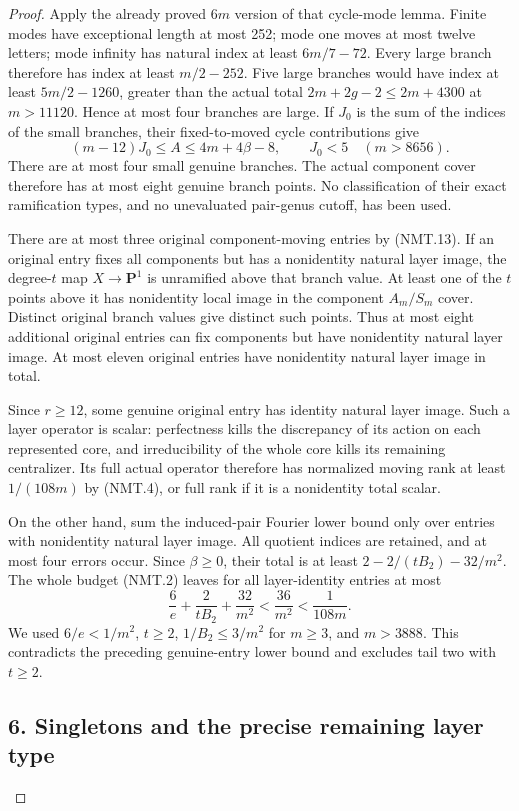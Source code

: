 \begin{proof}
Apply the already proved $6m$ version of that cycle-mode
lemma.  Finite modes have exceptional length at most 252;
mode one moves at most twelve letters; mode infinity has
natural index at least $6m/7-72$.
Every large branch therefore has index at least $m/2-252$.
Five large branches would have index at least $5m/2-1260$,
greater than the actual total $2m+2g-2\le2m+4300$ at
$m>11120$.  Hence at most four branches are large.
If $J_0$ is the sum of the indices of the small branches,
their fixed-to-moved cycle contributions give
\[
 (m-12)J_0\le A\le4m+4\beta-8,\qquad J_0<5
                          \quad(m>8656).
 \tag{NMT.24}
\]
There are at most four small genuine branches.  The actual
component cover therefore has at most eight genuine branch
points.  No classification of their exact ramification types,
and no unevaluated pair-genus cutoff, has been used.

There are at most three original component-moving entries
by (NMT.13).  If an original entry fixes all components but
has a nonidentity natural layer image, the degree-$t$ map
$X\to\mathbf P^1$ is unramified above that branch value.
At least one of the $t$ points above it has nonidentity
local image in the component $A_m/S_m$ cover.
Distinct original branch values give distinct such points.
Thus at most eight additional original entries can fix
components but have nonidentity natural layer image.
At most eleven original entries have nonidentity natural
layer image in total.

Since $r\ge12$, some genuine original entry has identity
natural layer image.  Such a layer operator is scalar:
perfectness kills the discrepancy of its action on each
represented core, and irreducibility of the whole core
kills its remaining centralizer.  Its full actual operator
therefore has normalized moving rank at least $1/(108m)$
by (NMT.4), or full rank if it is a nonidentity total scalar.

On the other hand, sum the induced-pair Fourier lower
bound only over entries with nonidentity natural layer
image.  All quotient indices are retained, and at most
four errors occur.  Since $\beta\ge0$, their total is at
least $2-2/(tB_2)-32/m^2$.
The whole budget (NMT.2) leaves for all layer-identity
entries at most
\[
 \frac6e+\frac2{tB_2}+\frac{32}{m^2}
 <\frac{36}{m^2}<\frac1{108m}.
 \tag{NMT.25}
\]
We used $6/e<1/m^2$, $t\ge2$, $1/B_2\le3/m^2$ for
$m\ge3$, and $m>3888$.
This contradicts the preceding genuine-entry lower bound
and excludes tail two with $t\ge2$.

\subsection*{6. Singletons and the precise remaining layer type}


\end{proof}
